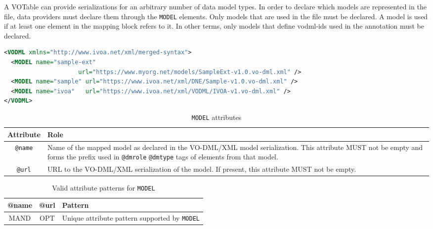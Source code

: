A VOTable can provide serializations for an arbitrary number of data model
types. In order to declare which models are represented in the file, data
providers must declare them through the \texttt{MODEL} elements.
Only models that are used in the file must be declared. A model is
used if at least one element in the mapping block refers to it. In other terms, only models that define vodml-ids used in the
annotation must be declared.

\begin{lstlisting}[caption={Example \texttt{MODEL} mapping block},language=XML]
<VODML xmlns="http://www.ivoa.net/xml/merged-syntax">
  <MODEL name="sample-ext"
                     url="https://www.myorg.net/models/SampleExt-v1.0.vo-dml.xml" />
  <MODEL name="sample" url="https://www.ivoa.net/xml/DNE/Sample-v1.0.vo-dml.xml" />
  <MODEL name="ivoa"   url="https://www.ivoa.net/xml/VODML/IVOA-v1.vo-dml.xml" />
</VODML>
\end{lstlisting}

\begin{table}[!htbp]
  \small
  \centering
  \begin{tabulary}{\linewidth}{|c|J|}       
    \hline 
         \textbf{Attribute} & 
         \textbf {Role}\\
    \hline
    \hline  
         \texttt{@name}  & 
         Name of the mapped model as declared in the VO-DML/XML model serialization.  This attribute MUST not be empty and forms the prefix used in  \texttt{@dmrole}  \texttt{@dmtype} tags of elements from that model.  \\
    \hline 
         \texttt{@url} & 
         URL to the VO-DML/XML serialization of the model. If present, this attribute MUST not be empty.\\
    \hline 
  \end{tabulary}
  \caption{\texttt{MODEL} attributes} 
  \label{tbl:model-att}
\end{table}


\begin{table}[!htbp]
  \small
  \centering
  \begin{tabulary}{\linewidth}{|c |c |J|}
    \hline 
        \textbf{@name} &
        \textbf{@url} &
        \textbf{Pattern}\\
    \hline      \hline  
        MAND &           
        OPT &           
        Unique attribute pattern supported by \texttt{MODEL}\\
    \hline 
  \end{tabulary}
  \caption{Valid attribute patterns for  \texttt{MODEL}} 
  \label{tbl:model-pattern}
\end{table}
